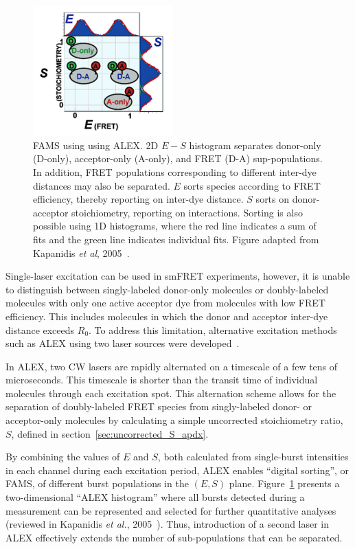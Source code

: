 \begin{figure}
    \centering
    \includegraphics[width=0.48\textwidth]{chapters/figures/FAMS.jpg}
    \caption{\label{fig:FAMS} 
    \ac{FAMS} using  using  \ac{ALEX}.  
    2D $E - S$ histogram separates donor-only (D-only),  acceptor-only (A-only), and FRET (D-A) sup-populations.  
    In addition, FRET populations corresponding to different inter-dye distances may also be separated. 
    $E$ sorts species according to FRET efficiency, thereby reporting on inter-dye distance. 
    $S$ sorts on donor-acceptor stoichiometry,  reporting  on  interactions.  Sorting  is  also  possible  using  1D  histograms, where the red line indicates a sum  of fits and the green line indicates individual fits. 
    Figure adapted from Kapanidis \textit{et al}, 2005~\cite{kapanidis_ACR_2005}.
    }
\end{figure}

Single-laser excitation can be used in \ac{smFRET} experiments, however, it is unable to distinguish between singly-labeled donor-only molecules or doubly-labeled molecules with only one active acceptor dye from molecules with low FRET efficiency. 
This includes molecules in which the donor and acceptor inter-dye distance exceeds $R_0$. 
To address this limitation, alternative excitation methods such as \ac{ALEX} using two laser sources were developed~\cite{kapanidis_PNAS_2004}.

In \ac{ALEX}, two \ac{CW} lasers are rapidly alternated on a timescale of a few tens of microseconds. 
This timescale is shorter than the transit time of individual molecules through each excitation spot. 
This alternation scheme allows for the separation of doubly-labeled FRET species from singly-labeled donor- or acceptor-only molecules by calculating a simple uncorrected stoichiometry ratio, $S$, defined in section~\ref{sec:uncorrected_S_apdx}.

By combining the values of $E$ and $S$, both calculated from single-burst intensities in each channel during each excitation period, ALEX enables \enquote{digital sorting}, or \ac{FAMS}, of different burst populations in the $(E, S)$ plane.
Figure~\ref{fig:FAMS} presents a two-dimensional \enquote{ALEX histogram} where all bursts detected during a measurement can be represented and selected for further quantitative analyses~\cite{kapanidis_PNAS_2004,lee_BPJ_2005,laurence_PNAS_2005,muller_BJ_2005} (reviewed in Kapanidis \textit{et al.}, 2005~\cite{kapanidis_ACR_2005}).
Thus, introduction of a second laser in \ac{ALEX} effectively extends the number of sub-populations that can be separated. 


